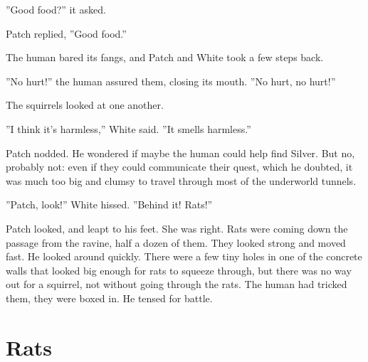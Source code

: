 \documentclass[12pt]{book}
\begin{document}
 ''Good food?'' it asked.\par
 Patch replied, ''Good food.''\par
 The human bared its fangs, and Patch and White took a few steps back.\par
 ''No hurt!'' the human assured them, closing its mouth. ''No hurt, no hurt!''\par
 The squirrels looked at one another.\par
 ''I think it's harmless,'' White said. ''It smells harmless.''\par
 Patch nodded. He wondered if maybe the human could help find Silver. But no, probably not: even if they could communicate their quest, which he doubted, it was much too big and clumsy to travel through most of the underworld tunnels.\par
 ''Patch, look!'' White hissed. ''Behind it! Rats!''\par
 Patch looked, and leapt to his feet. She was right. Rats were coming down the passage from the ravine, half a dozen of them. They looked strong and moved fast. He looked around quickly. There were a few tiny holes in one of the concrete walls that looked big enough for rats to squeeze through, but there was no way out for a squirrel, not without going through the rats. The human had tricked them, they were boxed in. He tensed for battle.\par

\section{Rats}
\end{document}
